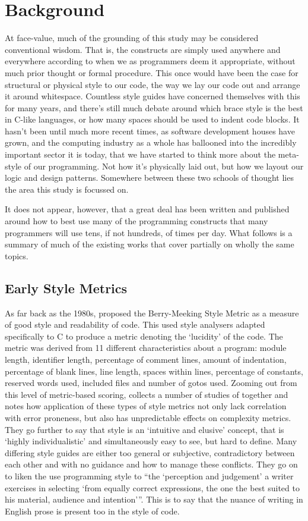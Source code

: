 \documentclass{article}
\begin{document}
\section{Background}
\label{sec:background}
    At face-value, much of the grounding of this study may be considered conventional wisdom. That is, the constructs are simply used anywhere and everywhere according to when we as programmers deem it appropriate, without much prior thought or formal procedure. This once would have been the case for structural or physical style to our code, the way we lay our code out and arrange it around whitespace. Countless style guides have concerned themselves with this for many years, and there's still much debate around which brace style is the best in C-like languages, or how many spaces should be used to indent code blocks. It hasn't been until much more recent times, as software development houses have grown, and the computing industry as a whole has ballooned into the incredibly important sector it is today, that we have started to think more about the meta-style of our programming. Not how it's physically laid out, but how we layout our logic and design patterns. Somewhere between these two schools of thought lies the area this study is focussed on.

    It does not appear, however, that a great deal has been written and published around how to best use many of the programming constructs that many programmers will use tens, if not hundreds, of times per day. What follows is a summary of much of the existing works that cover partially on wholly the same topics.
    \subsection{Early Style Metrics}
        As far back as the 1980s, \cite{berryMeekingStyle} proposed the Berry-Meeking Style Metric as a measure of good style and readability of code. This used style analysers adapted specifically to C to produce a metric denoting the `lucidity' of the code. The metric was derived from 11 different characteristics about a program: module length, identifier length, percentage of comment lines, amount of indentation, percentage of blank lines, line length, spaces within lines, percentage of constants, reserved words used, included files and number of gotos used. Zooming out from this level of metric-based scoring, \cite{paradigmForStyleResearch} collects a number of studies of together and notes how application of these types of style metrics not only lack correlation with error proneness, but also has unpredictable effects on complexity metrics. They go further to say that style is an `intuitive and elusive' concept, that is `highly individualistic' and simultaneously easy to see, but hard to define. Many differing style guides are either too general or subjective, contradictory between each other and with no guidance and how to manage these conflicts. They go on to liken the use programming style to ``the `perception and judgement' a writer exercises in selecting `from equally correct expressions, the one the best suited to his material, audience and intention'{}''. This is to say that the nuance of writing in English prose is present too in the style of code.
\end{document}
